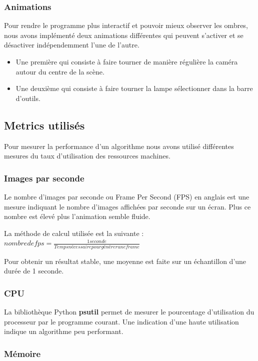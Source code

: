 \documentclass[a4paper,12pt]{report}
\begin{document}
\subsubsection{Animations}

Pour rendre le programme plus interactif et pouvoir mieux observer les ombres, nous avons implémenté deux animations différentes qui peuvent s'activer et se désactiver indépendemment l'une de l'autre.


\begin{itemize}
  \item Une première qui consiste à faire tourner de manière régulière la caméra autour du centre de la scène.
  \item Une deuxième qui consiste à faire tourner la lampe sélectionner dans la barre d'outils.
\end{itemize}

\subsection{Metrics utilisés}

Pour mesurer la performance d'un algorithme nous avons utilisé différentes mesures du taux d'utilisation des ressources machines.

\subsubsection{Images par seconde}

Le nombre d'images par seconde ou Frame Per Second (FPS) en anglais est une mesure indiquant le nombre d'images affichées par seconde sur un écran. Plus ce nombre est élevé plus l'animation semble fluide.


La méthode de calcul utilisée est la suivante : $nombre de fps = \frac{1 seconde}{Temps  nécessaire pour générer une frame}$

Pour obtenir un résultat stable, une moyenne est faite sur un échantillon d'une durée de 1 seconde.

\subsubsection{CPU}
La bibliothèque Python \textbf{psutil} permet de mesurer le pourcentage d'utilisation du processeur par le programme courant. Une indication d'une haute utilisation indique un algorithme peu performant.

\subsubsection{Mémoire}
\end{document}
